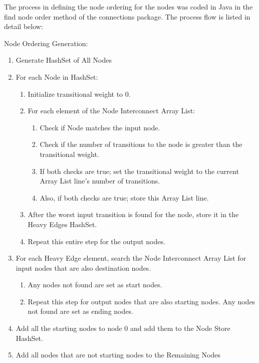 The process in defining the node ordering for the nodes was coded in Java in the
find node order method of the connections package.  The process flow is listed
in detail below:

\begin{description}
    \item[Node Ordering Generation:]
\end{description}
 \begin{enumerate}
   \item Generate HashSet of All Nodes
   \item For each Node in HashSet:
   \begin{enumerate}
     \item Initialize transitional weight to 0.
     \item For each element of the Node Interconnect Array List:
     \begin{enumerate}
       \item Check if Node matches the input node.
       \item Check if the number of transitions to the node is greater than the
       transitional weight.
       \item If both checks are true; set the transitional weight to the current
       Array List line's number of transitions.
       \item Also, if both checks are true; store this Array List line.
     \end{enumerate}
     \item After the worst input transition is found for the node, store it in
     the Heavy Edges HashSet.
     \item Repeat this entire step for the output nodes.
   \end{enumerate}
   \item For each Heavy Edge element, search the Node Interconnect Array List
   for input nodes that are also destination nodes.
   \begin{enumerate}
     \item Any nodes not found are set as start nodes.
     \item Repeat this step for output nodes that are also starting nodes.  Any
     nodes not found are set as ending nodes.
   \end{enumerate}
   \item Add all the starting nodes to node 0 and add them to the Node Store
   HashSet.
   \item Add all nodes that are not starting nodes to the Remaining Nodes

\end{enumerate}

